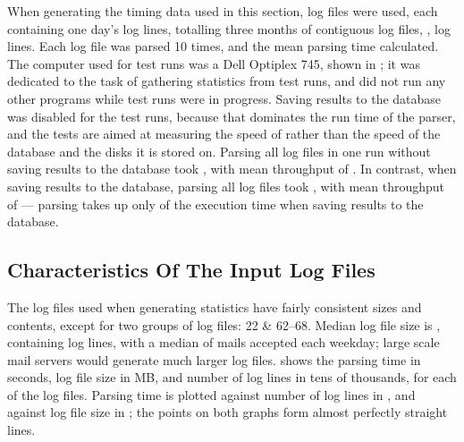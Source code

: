 When generating the timing data used in this section, \numberOFlogFILES{}
log files were used, each containing one day's log lines, totalling three
months of contiguous log files,
, \numberOFlogLINEShuman{}
log lines.  Each log file was parsed 10 times, and the mean parsing time
calculated.  The computer used for test runs was a Dell Optiplex 745, shown
in ; it was
dedicated to the task of gathering statistics from test runs, and did not
run any other programs while test runs were in progress.  Saving results to
the database was disabled for the test runs, because that dominates the run
time of the parser, and the tests are aimed at measuring the speed of
\parsername{} rather than the speed of the database and the disks it is
stored on.  Parsing all \numberOFlogFILES{} log files in one run without
saving results to the database took
, with mean throughput of
.  In contrast, when saving
results to the database, parsing all \numberOFlogFILES{} log files took
, with mean throughput of
 --- parsing takes up only
 of the
execution time when saving results to the database.

\subsection{Characteristics Of The Input Log Files}

The \numberOFlogFILES{} log files used when generating statistics have
fairly consistent sizes and contents, except for two groups of log files:
22 \& 62--68.  Median log file size is
, containing
 log lines, with a median
of  mails accepted
each weekday; large scale mail servers would generate much larger log
files.   shows the parsing time in seconds, log file size in MB, and number
of log lines in tens of thousands, for each of the \numberOFlogFILES{} log
files.  Parsing time is plotted against number of log lines in
, and against
log file size in ;
the points on both graphs form almost perfectly straight lines.

